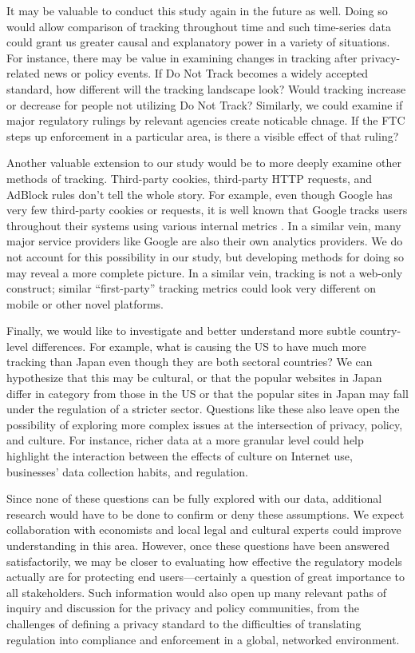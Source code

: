 \documentclass[conference]{IEEEtran}
\begin{document}
It may be valuable to conduct this study again in the future as well. Doing so would allow comparison of tracking throughout time and such time-series data could grant us greater causal and explanatory power in a variety of situations. For instance, there may be value in examining changes in tracking after privacy-related news or policy events. If Do Not Track becomes a widely accepted standard, how different will the tracking landscape look? Would tracking increase or decrease for people not utilizing Do Not Track? Similarly, we could examine if major regulatory rulings by relevant agencies create noticable chnage. If the FTC steps up enforcement in a particular area, is there a visible effect of that ruling?

Another valuable extension to our study would be to more deeply examine other methods of tracking. Third-party cookies, third-party HTTP requests, and AdBlock rules don't tell the whole story. For example, even though Google has very few third-party cookies or requests, it is well known that Google tracks users throughout their systems using various internal metrics \cite{googlehist}. In a similar vein, many major service providers like Google are also their own analytics providers. We do not account for this possibility in our study, but developing methods for doing so may reveal a more complete picture. In a similar vein, tracking is not a web-only construct; similar ``first-party'' tracking metrics could look very different on mobile or other novel platforms.

Finally, we would like to investigate and better understand more subtle country-level differences. For example, what is causing the US to have much more tracking than Japan even though they are both sectoral countries? We can hypothesize that this may be cultural, or that the popular websites in Japan differ in category from those in the US or that the popular sites in Japan may fall under the regulation of a stricter sector. Questions like these also leave open the possibility of exploring more complex issues at the intersection of privacy, policy, and culture. For instance, richer data at a more granular level could help highlight the interaction between the effects of culture on Internet use, businesses' data collection habits, and regulation.

Since none of these questions can be fully explored with our data, additional research would have to be done to confirm or deny these assumptions. We expect collaboration with economists and local legal and cultural experts could improve understanding in this area. However, once these questions have been answered satisfactorily, we may be closer to evaluating how effective the regulatory models actually are for protecting end users---certainly a question of great importance to all stakeholders. Such information would also open up many relevant paths of inquiry and discussion for the privacy and policy communities, from the challenges of defining a privacy standard to the difficulties of translating regulation into compliance and enforcement in a global, networked environment. 
\end{document}
